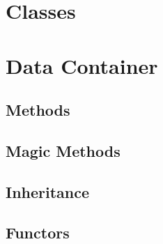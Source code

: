 \chapter{Classes}
\chapter{Data Container}
\section{Methods}
\section{Magic Methods}
\section{Inheritance}
\section{Functors}
